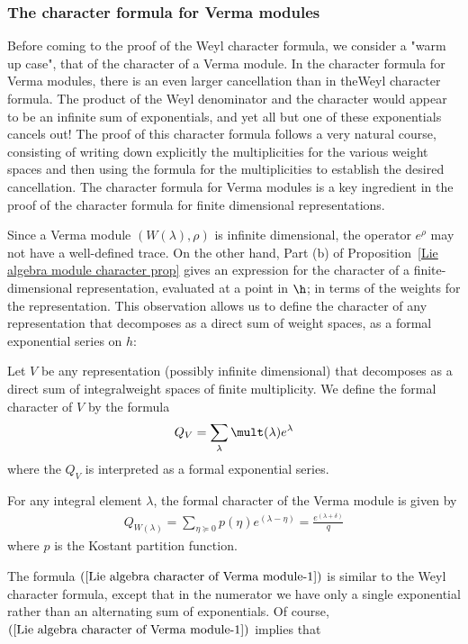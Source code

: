 \subsubsection{The character formula for Verma modules}
Before coming to the proof of the Weyl character formula, we consider a "warm up case", that of the character of a Verma module. In the character formula for Verma modules, there is an even larger cancellation than in theWeyl character formula. The product of the Weyl denominator and the character would appear to be an infinite sum of exponentials, and yet all but one of these exponentials cancels out! The proof of this character formula follows a very natural course, consisting of writing down explicitly the multiplicities for the various weight spaces and then using the formula for the multiplicities to establish the desired cancellation. The character formula for Verma modules is a key ingredient in the proof of the character formula for finite dimensional representations.\par
Since a Verma module $(W(\lambda),\rho)$ is infinite dimensional, the operator $e^{\rho}$ may not have a well-defined trace. On the other hand, Part (b) of Proposition~\ref{Lie algebra module character prop} gives an expression for the character of a finite-dimensional representation, evaluated at a point in $\h$; in terms of the weights for the representation. This observation allows us to define the character of any representation that decomposes as a direct sum of weight spaces, as a formal exponential series on $h$:
\begin{definition}
Let $V$ be any representation (possibly infinite dimensional) that decomposes as a direct sum of integralweight spaces of finite multiplicity. We define the formal character of $V$ by the formula
\[Q_V=\sum_\lambda\mult(\lambda)e^{\lambda}\]
where the $Q_V$ is interpreted as a formal exponential series.
\end{definition}
\begin{theorem}\label{Lie algebra character of Verma module}
For any integral element $\lambda$, the formal character of the Verma module is given by
\begin{align}\label{Lie algebra character of Verma module-1}
Q_{W(\lambda)}=\sum_{\eta\succeq 0}p(\eta)e^{(\lambda-\eta)}=\frac{e^{(\lambda+\delta)}}{q}
\end{align}
where $p$ is the Kostant partition function.
\end{theorem}
The formula $(\ref{Lie algebra character of Verma module-1})$ is similar to the Weyl character formula, except that in the numerator we have only a single exponential rather than an alternating sum of exponentials. Of course, $(\ref{Lie algebra character of Verma module-1})$ implies that
